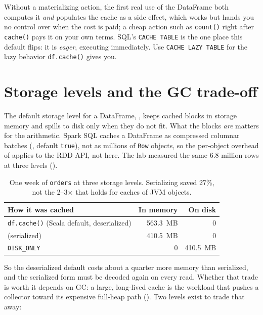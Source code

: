 Without a materializing action, the first real use of the DataFrame both computes
it \emph{and} populates the cache as a side effect, which works but hands you no
control over when the cost is paid; a cheap action such as \texttt{count()} right
after \texttt{cache()} pays it on your own terms. SQL's \texttt{CACHE TABLE} is
the one place this default flips: it is \emph{eager}, executing immediately.
Use \texttt{CACHE LAZY TABLE} for the lazy behavior \texttt{df.cache()} gives you.

\section{Storage levels and the GC trade-off}
\label{sec:caching-storage-levels}

The default storage level for a DataFrame, , keeps
cached blocks in storage memory and spills to disk only when they do not fit.
What the blocks \emph{are} matters for the arithmetic. Spark SQL caches a
DataFrame as compressed columnar batches (,
default \texttt{true}), not as millions of \texttt{Row} objects, so the
per-object overhead of  applies to the RDD API, not here. The
lab measured the same 6.8 million rows at three levels ().

\begin{table}[htbp]
\centering\footnotesize
\renewcommand{\arraystretch}{1.25}
\begin{tabular}{@{}P{6.0cm}rr@{}}
\toprule
\textbf{How it was cached} & \textbf{In memory} & \textbf{On disk} \\
\midrule
\texttt{df.cache()} (Scala default, deserialized) & 563.3~MB & 0 \\
 (serialized) & 410.5~MB & 0 \\
\texttt{DISK\_ONLY} & 0 & 410.5~MB \\
\bottomrule
\end{tabular}
\caption{One week of \texttt{orders} at three storage levels. Serializing saved
27\%, not the 2--3$\times$ that holds for caches of JVM objects.}
\label{tab:caching-lab-levels}
\end{table}

So the deserialized default costs about a quarter more memory than serialized,
and the serialized form must be decoded again on every read. Whether that trade
is worth it depends on GC: a large, long-lived cache is the workload that pushes
a collector toward its expensive full-heap path (). Two levels
exist to trade that away:


